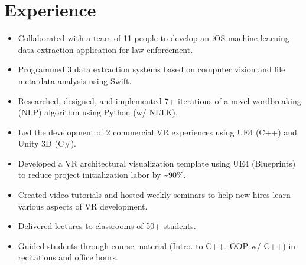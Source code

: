 \documentclass[]{deedy_resume}
\begin{document}
\hfill
\begin{minipage}[t]{0.66\textwidth} 


\section{Experience}
\begin{itemize}[noitemsep,topsep=0pt]
\item Collaborated with a team of 11 people to develop an iOS machine learning data extraction application for law enforcement.
\item Programmed 3 data extraction systems based on computer vision and file meta-data analysis using Swift.
\item Researched, designed, and implemented 7+ iterations of a novel wordbreaking (NLP) algorithm using Python (w/ NLTK).
\end{itemize}
\vspace{3mm}

\begin{itemize}[noitemsep,topsep=0pt]
\item Led the development of 2 commercial VR experiences using UE4 (C++) and Unity 3D (C\#).
\item Developed a VR architectural visualization template using UE4 (Blueprints) to reduce project initialization labor by \~{}90\%.
\item Created video tutorials and hosted weekly seminars to help new hires learn various aspects of VR development.
\end{itemize}
\vspace{3mm}

\begin{itemize}[noitemsep,topsep=0pt]
\itemsep0em 
\item Delivered lectures to classrooms of 50+ students.
\item Guided students through course material (Intro. to C++, OOP w/ C++) in recitations and office hours.
\end{itemize}
\sectionsep


\end{minipage}
\end{document}
